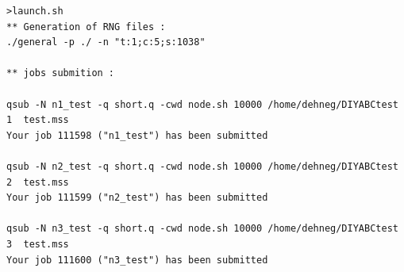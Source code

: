 \begin{minipage}[c]{0.99\textwidth}%
 


\begin{lstlisting}
>launch.sh
** Generation of RNG files :
./general -p ./ -n "t:1;c:5;s:1038"

** jobs submition :

qsub -N n1_test -q short.q -cwd node.sh 10000 /home/dehneg/DIYABCtest 1  test.mss
Your job 111598 ("n1_test") has been submitted

qsub -N n2_test -q short.q -cwd node.sh 10000 /home/dehneg/DIYABCtest 2  test.mss
Your job 111599 ("n2_test") has been submitted

qsub -N n3_test -q short.q -cwd node.sh 10000 /home/dehneg/DIYABCtest 3  test.mss
Your job 111600 ("n3_test") has been submitted


\end{lstlisting}
\end{minipage}
